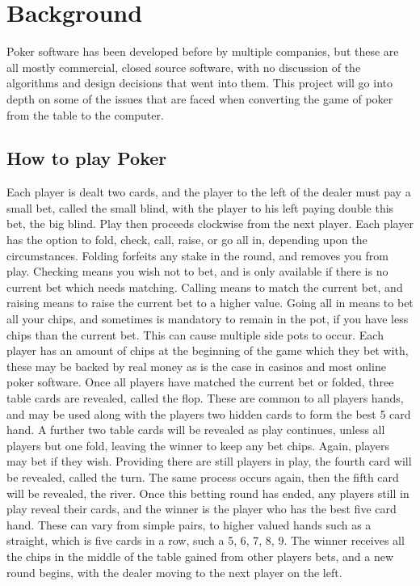 \section{Background}
Poker software has been developed before by multiple companies, but these
are all mostly commercial, closed source software, with no discussion of the
algorithms and design decisions that went into them. This project will go
into depth on some of the issues that are faced when converting the game of
poker from the table to the computer.

\subsection{How to play Poker}
Each player is dealt two cards, and the player to the left of the dealer must
pay a small bet, called the small blind, with the player to his left paying 
double this bet, the big blind. Play then proceeds clockwise from the next
player. Each player has the option to fold, check, call, raise, or go all in,
depending upon the circumstances. Folding forfeits any stake in the round, and
removes you from play. Checking means you wish not to bet, and is only
available if there is no current bet which needs matching. Calling means to
match the current bet, and raising means to raise the current bet to a higher
value. Going all in means to bet all your chips, and sometimes is mandatory to
remain in the pot, if you have less chips than the current bet. This can cause
multiple side pots to occur. Each player has an amount of chips at the 
beginning of the game which they bet with, these may be backed by real money as
is the case in casinos and most online poker software. Once all players have
matched the current bet or folded, three table cards are revealed, called
the flop. These are common to all players hands, and may be used along with
the players two hidden cards to form the best 5 card hand. A further two table
cards will be revealed as play continues, unless all players but one fold,
leaving the winner to keep any bet chips. Again, players may bet if they wish.
Providing there are still players in play, the fourth card will be revealed, 
called the turn. The same process occurs again, then the fifth card will be
revealed, the river. Once this betting round has ended, any players still
in play reveal their cards, and the winner is the player who has the best
five card hand. These can vary from simple pairs, to higher valued hands such
as a straight, which is five cards in a row, such a 5, 6, 7, 8, 9. The winner
receives all the chips in the middle of the table gained from other players
bets, and a new round begins, with the dealer moving to the next player on the
left.

